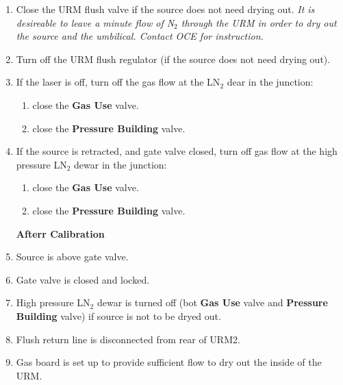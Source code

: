\begin{enumerate}
    \item \CheckBox[name=encp54]{} Close the URM flush valve if the source does not need drying
      out. {\it It is desireable to leave a minute flow of N$_{2}$
        through the URM in order to dry out the source and the
        umbilical. Contact OCE for instruction.}
    \item \CheckBox[name=encp55]{} Turn off the URM flush regulator (if the source does not
      need drying out).
    \item \CheckBox[name=encp56]{} If the laser is off, turn off the gas flow at the LN$_{2}$
      dear in the junction:
      \begin{enumerate}
      \item \CheckBox[name=encp57]{} close the {\bf Gas Use} valve.
      \item \CheckBox[name=encp1]{} close the {\bf Pressure Building} valve.
      \end{enumerate}
    \item \CheckBox[name=encp58]{} If the source is retracted, and gate valve closed, turn off
      gas flow at the high pressure LN$_{2}$ dewar in the junction:
      \begin{enumerate}
      \item \CheckBox[name=encp59]{} close the {\bf Gas Use} valve.
      \item \CheckBox[name=encp60]{} close the {\bf Pressure Building} valve.
      \end{enumerate}
      \begin{center} {\bf Afterr Calibration} \end{center}
    \item \CheckBox[name=encp61]{} Source is above gate valve.
    \item \CheckBox[name=encp62]{} Gate valve is closed and locked.
    \item \CheckBox[name=encp63]{} High pressure LN$_{2}$ dewar is turned off (bot {\bf Gas
      Use} valve and {\bf Pressure Building} valve) if source is not
      to be dryed out.
    \item \CheckBox[name=encp64]{} Flush return line is disconnected from rear of URM2.
    \item \CheckBox[name=encp65]{} Gas board is set up to provide sufficient flow to dry out
      the inside of the URM.
\end{enumerate}


